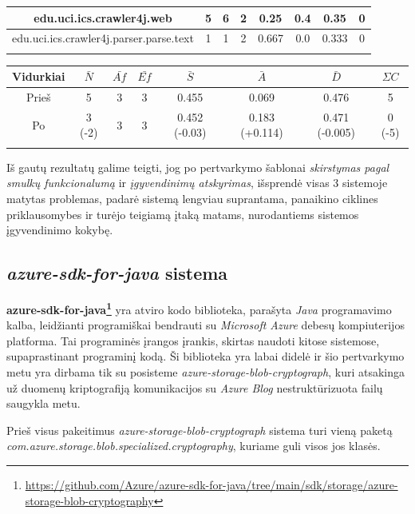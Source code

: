 \begin{center}
\begin{tabular}{|c|c|c|c|c|c|c|c|}
        \hline
        edu.uci.ics.crawler4j.web & 5 & 6 & 2 & 0.25 & 0.4 & 0.35 & 0 \\
        \hline
        edu.uci.ics.crawler4j.parser.parse.text & 1 & 1 & 2 & 0.667 & 0.0 & 0.333 & 0 \\
        \hline
        \label{table:abstr}
    \end{tabular}
    \begin{tabular}{|c|c|c|c|c|c|c|c|}
        \hline
        Vidurkiai & $\bar{N}$ & $\bar{Af}$ & $\bar{Ef}$ & $\bar{S}$ & $\bar{A}$ & $\bar{D}$ & $\Sigma C$ \\ [0.5ex]
        \hline\hline
        Prieš & 5 & 3 & 3 & 0.455 & 0.069 & 0.476 & 5\\
        \hline
        Po & \cellcolor{green!25} 3 (-2) & 3 & 3 & \cellcolor{green!24} 0.452 (-0.03) & \cellcolor{green!25} 0.183 (+0.114) & \cellcolor{green!25} 0.471 (-0.005) & \cellcolor{green!25} 0 (-5)\\
        \hline
    \label{table:abstrs}
    \end{tabular}
\end{center}
Iš gautų rezultatų galime teigti, jog po pertvarkymo šablonai \textit{skirstymas pagal smulkų funkcionalumą} ir \textit{įgyvendinimų atskyrimas}, išsprendė visas 3 sistemoje matytas problemas,
padarė sistemą lengviau suprantama, panaikino ciklines priklausomybes ir turėjo teigiamą įtaką matams, nurodantiems
sistemos įgyvendinimo kokybę.


\subsection{\textit{azure-sdk-for-java} sistema}
\textbf{azure-sdk-for-java\footnote{\url{https://github.com/Azure/azure-sdk-for-java/tree/main/sdk/storage/azure-storage-blob-cryptography}}} yra atviro kodo
biblioteka, parašyta \textit{Java} programavimo kalba, leidžianti programiškai bendrauti su \textit{Microsoft Azure} debesų kompiuterijos platforma.
Tai programinės įrangos įrankis, skirtas naudoti kitose sistemose, supaprastinant programinį kodą.
Ši biblioteka yra labai didelė ir šio pertvarkymo metu yra dirbama tik su posisteme \textit{azure-storage-blob-cryptograph}, kuri atsakinga už duomenų kriptografiją
komunikacijos su \textit{Azure Blog} nestruktūrizuota failų saugykla metu.

Prieš visus pakeitimus \textit{azure-storage-blob-cryptograph} sistema turi vieną paketą \textit{com.azure.storage.blob.specialized.cryptography}, kuriame guli visos jos klasės.

